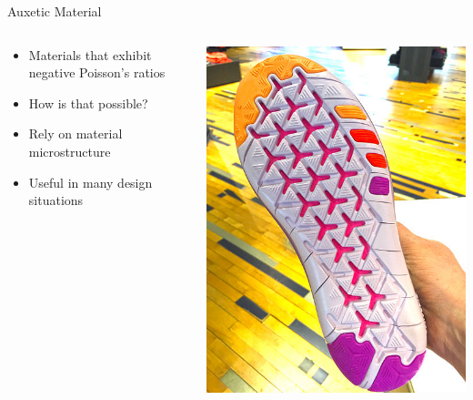 \documentclass[10pt, svgnames]{beamer}
\begin{document}
\begin{frame}[label={sec:orgc3b1431}]{Auxetic Material}
\begin{columns}
\begin{column}{0.5\columnwidth}
\begin{itemize}
\item Materials that exhibit negative Poisson's ratios

\item How is that possible?

\item Rely on material microstructure

\item Useful in many design situations
\end{itemize}
\end{column}

\begin{column}{0.5\columnwidth}
\begin{center}
\begin{center}
\includegraphics[width=.9\linewidth]{./pictures/auxetic-footwear.jpg}
\end{center}
\end{center}
\end{column}
\end{columns}
\end{frame}
\end{document}
